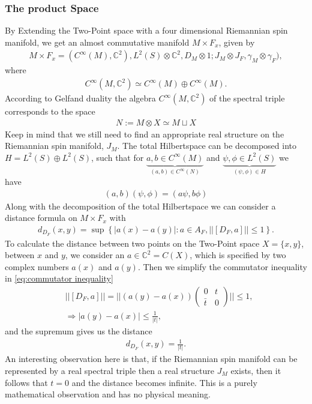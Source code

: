 \subsubsection{The product Space}
By Extending the Two-Point space with a four dimensional Riemannian spin
manifold, we get an almost commutative manifold $M\times F_x$, given by
\begin{align}
    M\times F_x = (C^\infty(M), \mathbb{C}^2), L^2(S)\otimes \mathbb{C}^2,
    D_M\otimes 1 ; J_M\otimes J_F, \gamma_M \otimes \gamma_F),
\end{align}
where
\begin{align}
   C^\infty(M, \mathbb{C}^2) \simeq C^\infty(M) \oplus  C^\infty(M).
\end{align}
According to Gelfand duality the algebra $C^\infty(M, \mathbb{C}^2)$ of the
spectral triple corresponds to the space
\begin{align}
    N:= M\otimes X \simeq M\sqcup X
\end{align}
Keep in mind that we still need to find an appropriate real structure on the
Riemannian spin manifold, $J_M$.
\newline
The total Hilbertspace can be decomposed into $H = L^2(S) \oplus L^2(S)$, such
that for
\newline
$\underbrace{a,b\in C^\infty(M)}_{(a, b) \in C^\infty(N)}$
and $\underbrace{\psi, \phi \in L^2(S)}_{(\psi, \phi) \in H}$ we have
\begin{align}
    (a, b)(\psi, \phi) = (a\psi, b\phi)
\end{align}
Along with the decomposition of the total Hilbertspace we can consider a
distance formula on $M\times F_x$ with
\begin{align}\label{eq:commutator inequality}
    d_{D_F}(x,y) = \sup\left\{  |a(x) - a(y)|:a\in A_F, ||[D_F, a]|| \leq
    1 \right\}.
\end{align}
To calculate the distance between two points on the Two-Point space $X= \{x,
y\}$, between $x$ and $y$, we consider an $a \in \mathbb{C}^2 = C(X)$, which is
specified by two complex numbers $a(x)$ and $a(y)$. Then we simplify the
commutator inequality in \ref{eq:commutator inequality}
\begin{align}
    &||[D_F , a]|| = ||(a(y) - a(x))\begin{pmatrix}0 &t\\\bar{t} &0
    \end{pmatrix}|| \leq 1,\\
    &\Rightarrow |a(y) - a(x)|\leq \frac{1}{|t|},
\end{align}
and the supremum gives us the distance
\begin{align}
    d_{D_F} (x,y) = \frac{1}{|t|}.
\end{align}
An interesting observation here is that, if the Riemannian spin manifold can be
represented by a real spectral triple then a real structure $J_M$ exists,
then it follows that $t=0$ and the distance becomes infinite. This is a purely
mathematical observation and has no physical meaning.

